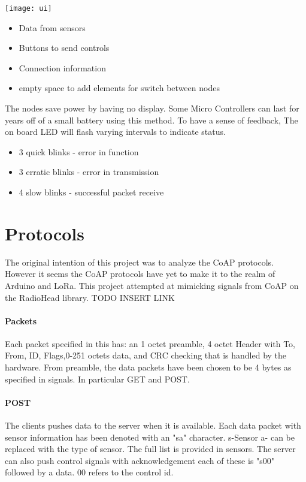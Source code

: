 \documentclass[]{report}
\begin{document}
	\texttt{[image: ui]}
	\begin{itemize}
		\item Data from sensors
		\item Buttons to send controls
		\item Connection information
		\item empty space to add elements for switch between nodes
	\end{itemize}

	The nodes save power by having no display. Some Micro Controllers can last for years off of a small battery using this method. To have a sense of feedback, The on board LED will flash varying intervals to indicate status.
	\begin{itemize}
		\item 3 quick blinks - error in function
		\item 3 erratic blinks - error in transmission
		\item 4 slow blinks - successful packet receive
	\end{itemize}

\section{Protocols}

The original intention of this project was to analyze the CoAP protocols. However it seems the CoAP protocols have yet to make it to the realm of Arduino and LoRa. This project attempted at mimicking signals from CoAP on the RadioHead library. TODO INSERT LINK
\paragraph{Packets}
Each packet specified in this has: an 1 octet preamble, 4 octet Header with To, From, ID, Flags,0-251 octets data, and CRC checking that is handled by the hardware. From preamble, the data packets have been chosen to be 4 bytes as specified in signals. In particular GET and POST. 

\paragraph{POST}
The clients pushes data to the server when it is available. Each data packet with sensor information has been denoted with an "sa" character. s-Sensor a- can be replaced with the type of sensor. The full list is provided in sensors. The server can also push control signals with acknowledgement each of these is "s00" followed by a data. 00 refers to the control id. 
\end{document}
